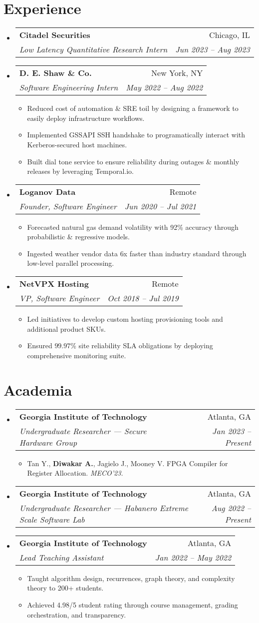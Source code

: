 \documentclass[a4paper,11pt]{extarticle}
\makeatletter
\newcommand{\resumeItem}[1]{
	\item\small{
		#1 \vspace{-1.2pt}
	}
}
\newcommand{\resumeSubheading}[4]{
	\vspace{-1pt}
    \item
		\begin{tabular*}{1\linewidth}{l@{\extracolsep{\fill}}r}
			\textbf{#1} & #2 \\
			\textit{#3} & \textit{#4} \\
		\end{tabular*}\vspace{-2pt}
}
\newcommand{\resumeSubHeadingListStart}{
    \begin{itemize}[leftmargin=0.15in,label={}]}
\newcommand{\resumeSubHeadingListEnd}{\end{itemize}}
\newcommand{\resumeItemListStart}{\begin{itemize}\vspace{-3pt}}
\newcommand{\resumeItemListEnd}{\end{itemize}\vspace{-3pt}}
\makeatother
\begin{document}
\section{Experience}
	\resumeSubHeadingListStart
        \resumeSubheading
            {Citadel Securities}
            {Chicago, IL}
            {Low Latency Quantitative Research Intern}
            {Jun 2023 -- Aug 2023}
        \resumeSubheading
            {D. E. Shaw \& Co.}
            {New York, NY}
            {Software Engineering Intern}
            {May 2022 -- Aug 2022}
		\resumeItemListStart
            \resumeItem{Reduced cost of automation \& SRE toil by
                designing a framework to easily deploy infrastructure
                workflows.}
            \resumeItem{Implemented GSSAPI SSH handshake to programatically
                interact with Kerberos-secured host machines.}
            \resumeItem{Built dial tone service to ensure reliability during
                outages \& monthly releases by leveraging Temporal.io.}
		\resumeItemListEnd
		\resumeSubheading
            {Loganov Data}
            {Remote}
		    {Founder, Software Engineer}
            {Jun 2020 -- Jul 2021}
		\resumeItemListStart
			\resumeItem{Forecasted natural gas demand volatility with 92\%
                accuracy through probabilistic \& regressive models.}
			\resumeItem{Ingested weather vendor data 6x faster than industry
				standard through low-level parallel processing.}
		\resumeItemListEnd
		\resumeSubheading
            {NetVPX Hosting}
            {Remote}
		    {VP, Software Engineer}
            {Oct 2018 -- Jul 2019}
		\resumeItemListStart
			\resumeItem{Led initiatives to develop custom hosting provisioning
				tools and additional product SKUs.}
			\resumeItem{Ensured $99.97$\% site reliability SLA obligations
                by deploying comprehensive monitoring suite.}
		\resumeItemListEnd
	\resumeSubHeadingListEnd

\section{Academia}
	\resumeSubHeadingListStart
        \resumeSubheading
            {Georgia Institute of Technology}
            {Atlanta, GA}
            {Undergraduate Researcher --- Secure Hardware Group}
            {Jan 2023 -- Present}
		\resumeItemListStart
            \resumeItem{Tan Y., \textbf{Diwakar A.}, Jagielo J., Mooney V.
                FPGA Compiler for Register Allocation. \textit{MECO'23.}}
		\resumeItemListEnd
        \resumeSubheading
            {Georgia Institute of Technology}
            {Atlanta, GA}
            {Undergraduate Researcher --- Habanero Extreme Scale Software Lab}
            {Aug 2022 -- Present}
        \resumeSubheading
            {Georgia Institute of Technology}
            {Atlanta, GA}
            {Lead Teaching Assistant}
            {Jan 2022 -- May 2022}
		\resumeItemListStart
			\resumeItem{Taught algorithm design, recurrences, graph
            theory, and complexity theory to 200+ students.}
            \resumeItem{Achieved 4.98/5 student rating through course management,
                grading orchestration, and transparency.}
		\resumeItemListEnd
	\resumeSubHeadingListEnd
\end{document}
